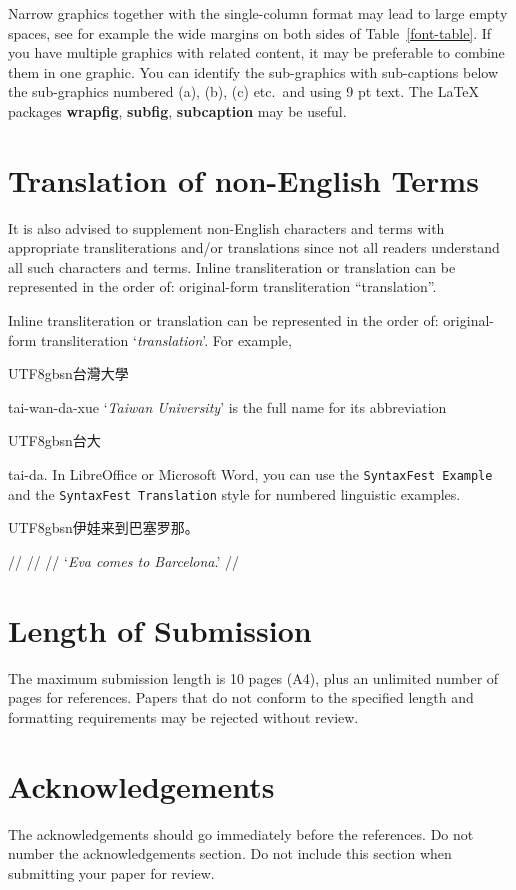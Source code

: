 \documentclass[11pt]{article}
\newcommand{\Chinese}[1]{\begin{CJK*}{UTF8}{gbsn}#1\end{CJK*}}
\begin{document}
Narrow graphics together with the single-column format may lead to large empty spaces, see for example the wide margins on both sides of Table~\ref{font-table}. If you have multiple graphics with related content, it may be preferable to combine them in one graphic. You can identify the sub-graphics with sub-captions below the sub-graphics numbered (a), (b), (c) etc.\ and using 9 pt text. The LaTeX packages \textbf{wrapfig}, \textbf{subfig}, \textbf{subcaption} may be useful.



\section{Translation of non-English Terms}

It is also advised to supplement non-English characters and terms with appropriate transliterations and/or translations
since not all readers understand all such characters and terms.
Inline transliteration or translation can be represented in
the order of: original-form transliteration ``translation''.

Inline transliteration or translation can be represented in the order of: original-form transliteration `\emph{translation}'. For example, \Chinese{台灣大學} tai-wan-da-xue `\emph{Taiwan University}' is the full name for its abbreviation \Chinese{台大} tai-da. In LibreOffice or Microsoft Word, you can use the \texttt{SyntaxFest Example} and the \texttt{SyntaxFest Translation} style for numbered linguistic examples.

\ex
\begingl
\gla \Chinese{伊娃来到巴塞罗那。}//
 //
 //
\glft `\emph{Eva comes to Barcelona}.' //
\endgl
\xe


\section{Length of Submission}
\label{sec:length}

The maximum submission length is 10 pages (A4), plus an unlimited number of pages for references. Papers that do not conform to the specified length and formatting requirements may be rejected without review.

\section*{Acknowledgements}

The acknowledgements should go immediately before the references. Do not number the acknowledgements section. Do not include this section when submitting your paper for review.
\end{document}

